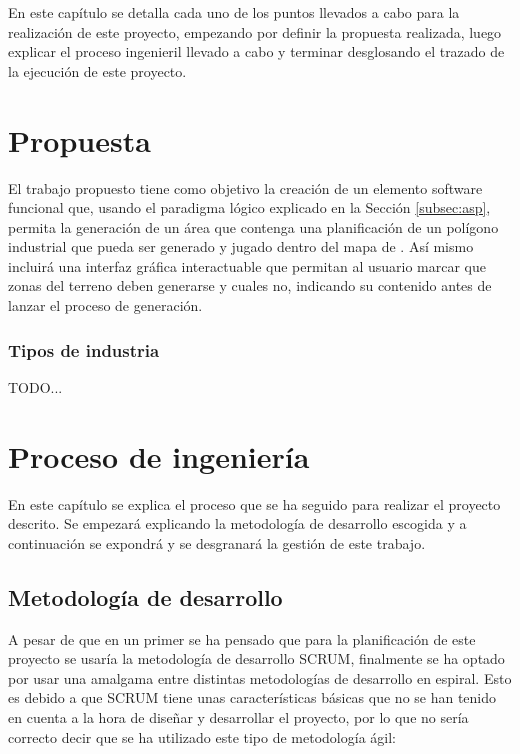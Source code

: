 En este capítulo se detalla cada uno de los puntos llevados a cabo para la realización de este proyecto, empezando por definir la propuesta realizada, luego explicar el proceso ingenieril llevado a cabo y terminar desglosando el trazado de la ejecución de este proyecto.

\section{Propuesta}

El trabajo propuesto tiene como objetivo la creación de un elemento software funcional que, usando el paradigma lógico explicado en la Sección \ref{subsec:asp}, permita la generación de un área que contenga una planificación de un polígono industrial que pueda ser generado y jugado dentro del mapa de \cities. Así mismo incluirá una interfaz gráfica interactuable que permitan al usuario marcar que zonas del terreno deben generarse y cuales no, indicando su contenido antes de lanzar el proceso de generación.

\subsubsection{Tipos de industria}
\label{subsubsec:terrain}

TODO...

\section{Proceso de ingeniería}

En este capítulo se explica el proceso que se ha seguido para realizar el proyecto descrito. Se empezará explicando la metodología de desarrollo escogida y a continuación se expondrá y se desgranará la gestión de este trabajo.

\subsection{Metodología de desarrollo}
\label{subsec:metodologia}

A pesar de que en un primer se ha pensado que para la planificación de este proyecto se usaría la metodología de desarrollo SCRUM\cite{Schwaber:2001:ASD:559553}\cite{Schwaber:2004:APM:984028}, finalmente se ha optado por usar una amalgama entre distintas metodologías de desarrollo en espiral. Esto es debido a que SCRUM tiene unas características básicas que no se han tenido en cuenta a la hora de diseñar y desarrollar el proyecto, por lo que no sería correcto decir que se ha utilizado este tipo de metodología ágil:

